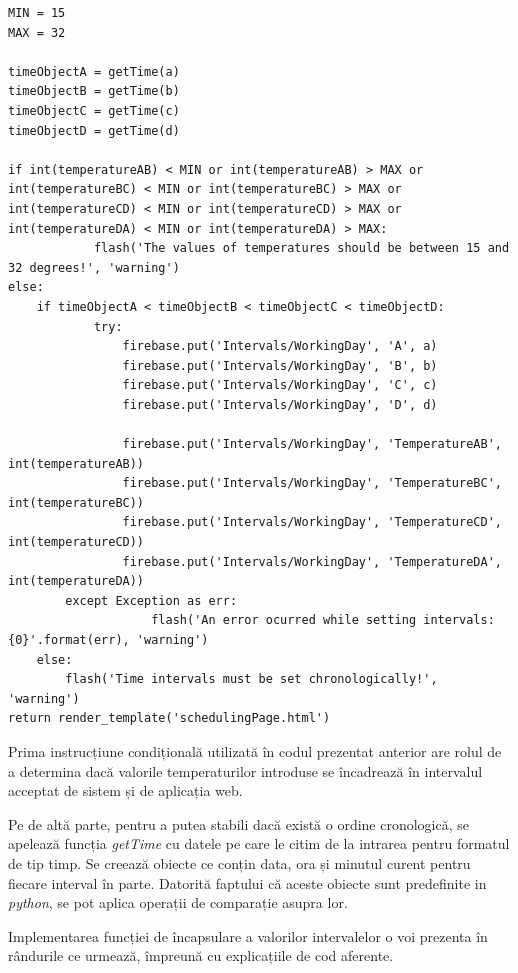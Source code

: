 \vspace{1em}
\begin{lstlisting}
MIN = 15
MAX = 32

timeObjectA = getTime(a)
timeObjectB = getTime(b)
timeObjectC = getTime(c)
timeObjectD = getTime(d)

if int(temperatureAB) < MIN or int(temperatureAB) > MAX or int(temperatureBC) < MIN or int(temperatureBC) > MAX or     			int(temperatureCD) < MIN or int(temperatureCD) > MAX or int(temperatureDA) < MIN or int(temperatureDA) > MAX:
            flash('The values of temperatures should be between 15 and 32 degrees!', 'warning')
else:
	if timeObjectA < timeObjectB < timeObjectC < timeObjectD:
      		try:
              	firebase.put('Intervals/WorkingDay', 'A', a)
              	firebase.put('Intervals/WorkingDay', 'B', b)
              	firebase.put('Intervals/WorkingDay', 'C', c)
              	firebase.put('Intervals/WorkingDay', 'D', d)

              	firebase.put('Intervals/WorkingDay', 'TemperatureAB', int(temperatureAB))
              	firebase.put('Intervals/WorkingDay', 'TemperatureBC', int(temperatureBC))
              	firebase.put('Intervals/WorkingDay', 'TemperatureCD', int(temperatureCD))
              	firebase.put('Intervals/WorkingDay', 'TemperatureDA', int(temperatureDA))
       	except Exception as err:
                	flash('An error ocurred while setting intervals: {0}'.format(err), 'warning')
	else:
		flash('Time intervals must be set chronologically!', 'warning')
return render_template('schedulingPage.html')
\end{lstlisting}
\vspace{2em} 

	Prima instrucțiune condițională utilizată în codul prezentat anterior are rolul de a determina dacă valorile temperaturilor introduse se încadrează în intervalul acceptat de sistem și de aplicația web.  

	Pe de altă parte, pentru a putea stabili dacă există o ordine cronologică, se apelează funcția \textit{getTime} cu datele pe care le citim de la intrarea pentru formatul de tip timp. Se creează obiecte ce conțin data, ora și minutul curent pentru fiecare interval în parte. Datorită faptului că aceste obiecte sunt predefinite in \textit{python}, se pot aplica operații de comparație asupra lor. 

	Implementarea funcției de încapsulare a valorilor intervalelor o voi prezenta în rândurile ce urmează, împreună cu explicațiile de cod aferente. 

